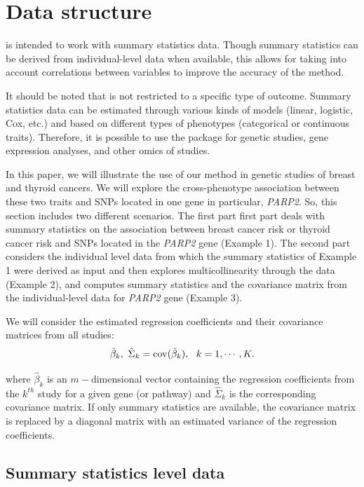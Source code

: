 \hypertarget{data-structure}{%
\section{Data structure}\label{data-structure}}

 is intended to work with summary statistics data. Though summary statistics can be derived from individual-level data when available, this allows for taking into account correlations between variables to improve the accuracy of the method.

It should be noted that  is not restricted to a specific type of outcome. Summary statistics data can be estimated through various kinds of models (linear, logistic, Cox, etc.) and based on different types of phenotypes (categorical or continuous traits). Therefore, it is possible to use the  package for genetic studies, gene expression analyses, and other omics of studies.

In this paper, we will illustrate the use of our method in genetic studies of breast and thyroid cancers. We will explore the cross-phenotype association between these two traits and SNPs located in one gene in particular, \emph{PARP2}. So, this section includes two different scenarios. The first part
first part deals with summary statistics on the association between breast cancer risk or thyroid cancer risk and SNPs located in the \emph{PARP2} gene (Example 1). The second part considers the individual level data from which the summary statistics of Example 1 were derived as input
and then explores multicollinearity through the data (Example 2), and computes summary statistics and the covariance matrix from the individual-level data for \emph{PARP2} gene (Example 3).

We will consider the estimated regression coefficients and their covariance matrices from all studies: \[{\hat{{\beta}}_k},~{\hat{{\Sigma}} _k} = {\mathop{\rm cov}} ({\hat{{ \beta}} _k}),~~k = 1, \cdots ,K.\]

where \({\hat{{\beta}}_k}\) is an \(m-\)dimensional vector containing the regression coefficients from the \(k^{th}\) study for a given gene (or pathway) and \({\hat{{\Sigma}} _k}\) is the corresponding covariance matrix. If only summary statistics are available, the covariance matrix is replaced by a diagonal matrix with an estimated variance of the regression coefficients.

\hypertarget{summary-statistics-level-data}{%
\subsection{Summary statistics level data}\label{summary-statistics-level-data}}

